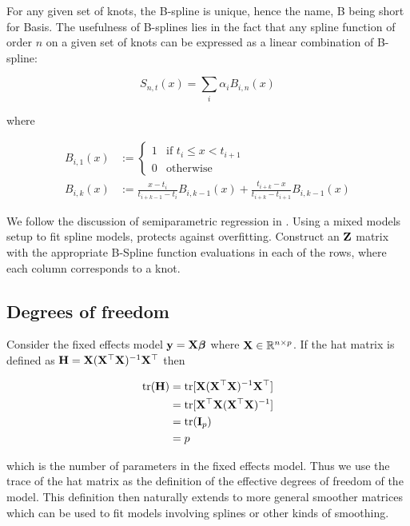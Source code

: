 \documentclass{article}[12pt]
\begin{document}
For any given set of knots, the B-spline is unique, hence the name, B being short for Basis. The usefulness
of B-splines lies in the fact that any spline function of order $n$ on a given set of knots can be expressed
as a linear combination of B-spline:

$$
S_{n, t}(x) = \sum_i \alpha_i B_{i, n}(x)
$$

where

\begin{align*}
B_{i, 1}(x) &:= \begin{cases}
1 & \text{if } t_i \leq x < t_{i+1} \\
0 & \text{otherwise}
\end{cases} \\
B_{i, k}(x) &:= \frac{x - t_i}{t_{i + k - 1} - t_i} B_{i, k-1} (x) + \frac{t_{i + k} - x}{t_{i + k} - t_{i + 1}} B_{i, k-1} (x)
\end{align*}

We follow the discussion of semiparametric regression in \cite{RuppertWandCarroll}.
Using a mixed models setup to fit spline models, protects against overfitting.
Construct an ${\bf Z}$ matrix with the appropriate B-Spline function evaluations in each of the rows, where
each column corresponds to a knot.

\subsection{Degrees of freedom}


Consider the fixed effects model ${\bf y} = {\bf X} {\boldsymbol \beta}$ where ${\bf X} \in {\mathbb{R}}^{n \times p}$. If the hat matrix is
defined as ${\bf H} = {\bf X} ({\bf X}^\top{\bf X})^{-1} {\bf X}^\top$ then

\begin{align*}
\text{tr}({\bf H}) &= \text{tr}[{\bf X}({\bf X}^\top{\bf X})^{-1}{\bf X}^\top] \\
&= \text{tr}[{\bf X}^\top{\bf X} ({\bf X}^\top{\bf X})^{-1}] \\
&= \text{tr}({\bf I}_p) \\
&= p
\end{align*}

which is the number of parameters in the fixed effects model. Thus we use the trace of the hat matrix as
the definition of the effective degrees of freedom of the model. This definition then naturally extends to
more general smoother matrices which can be used to fit models involving splines or other kinds of smoothing.
\end{document}
